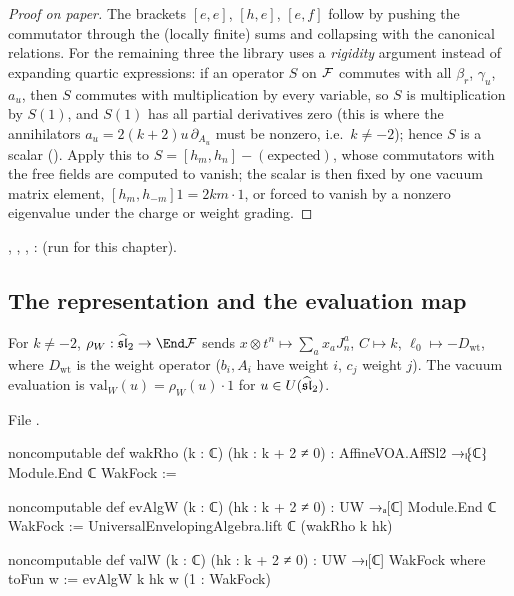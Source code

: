 \begin{proof}[Proof on paper]
The brackets $[e,e]$, $[h,e]$, $[e,f]$ follow by pushing the commutator through the (locally finite)
sums and collapsing with the canonical relations. For the remaining three the library uses a
\emph{rigidity} argument instead of expanding quartic expressions: if an operator $S$ on $\mathcal{F}$
commutes with all $\beta_r$, $\gamma_u$, $a_u$, then $S$ commutes with multiplication by every variable,
so $S$ is multiplication by $S(1)$, and $S(1)$ has all partial derivatives zero (this is where the
annihilators $a_u = 2(k+2)u\,\partial_{A_u}$ must be nonzero, i.e.\ $k\ne-2$); hence $S$ is a scalar
(\allowbreak{}\allowbreak{}\allowbreak{}\allowbreak{}\allowbreak{}). Apply this to $S = [h_m,h_n] - (\text{expected})$, whose
commutators with the free fields are computed to vanish; the scalar is then fixed by one vacuum
matrix element, $[h_m,h_{-m}]1 = 2km\cdot1$, or forced to vanish by a nonzero eigenvalue under the
charge or weight grading.
\end{proof}

\begin{status}
, , , :
\lean{[propext, Classical.}\allowbreak{}\allowbreak\lean{sound]} (run for this chapter).
\end{status}

\subsection{The representation and the evaluation map}

\begin{definition}\label{l08:def:wakrho}
For $k\ne-2$, $\rho_W : \leighthat\to\End\leightFock$ sends $x\otimes t^n\mapsto\sum_ax_aJ^a_n$,
$C\mapsto k$, $\ell_0\mapsto-D_{\mathrm{wt}}$, where $D_{\mathrm{wt}}$ is the weight operator ($b_i, A_i$
have weight $i$, $c_j$ weight $j$). The vacuum evaluation is $\mathrm{val}_W(u) = \rho_W(u)\cdot1$ for
$u\in U(\widehat{\mathfrak{sl}}_2)$.
\end{definition}

\noindent File .
\begin{leancode}
noncomputable def wakRho (k : ℂ) (hk : k + 2 ≠ 0) :
    AffineVOA.AffSl2 →ₗ⁅ℂ⁆ Module.End ℂ WakFock :=

noncomputable def evAlgW (k : ℂ) (hk : k + 2 ≠ 0) : UW →ₐ[ℂ] Module.End ℂ WakFock :=
  UniversalEnvelopingAlgebra.lift ℂ (wakRho k hk)

noncomputable def valW (k : ℂ) (hk : k + 2 ≠ 0) : UW →ₗ[ℂ] WakFock where
  toFun w := evAlgW k hk w (1 : WakFock)
\end{leancode}

